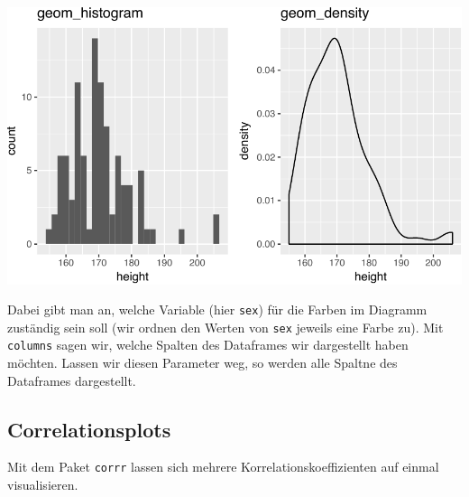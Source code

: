 \documentclass[12pt,]{book}
\newenvironment{Shaded}{\begin{snugshade}}{\end{snugshade}}
\newcommand{\KeywordTok}[1]{\textcolor[rgb]{0.13,0.29,0.53}{\textbf{{#1}}}}
\newcommand{\StringTok}[1]{\textcolor[rgb]{0.31,0.60,0.02}{{#1}}}
\newcommand{\CommentTok}[1]{\textcolor[rgb]{0.56,0.35,0.01}{\textit{{#1}}}}
\newcommand{\NormalTok}[1]{{#1}}
\begin{document}
\begin{center}\includegraphics[width=0.7\linewidth]{050_Daten_visualisieren_files/figure-latex/unnamed-chunk-33-1} \end{center}

Dabei gibt man an, welche Variable (hier \texttt{sex}) für die Farben im
Diagramm zuständig sein soll (wir ordnen den Werten von \texttt{sex}
jeweils eine Farbe zu). Mit \texttt{columns} sagen wir, welche Spalten
des Dataframes wir dargestellt haben möchten. Lassen wir diesen
Parameter weg, so werden alle Spaltne des Dataframes dargestellt.

\subsection{Correlationsplots}\label{correlationsplots}

Mit dem Paket \texttt{corrr} lassen sich mehrere
Korrelationskoeffizienten auf einmal visualisieren.

\begin{Shaded}
\end{Shaded}
\end{document}
